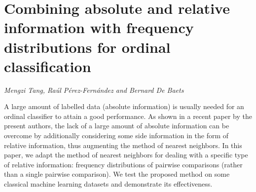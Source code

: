 \documentclass[../booklet.tex]{subfiles}
\begin{document}
\section[Combining absolute and relative information with frequency distributions for ordinal classification. {\it Mengzi Tang, Raúl Pérez-Fernández and Bernard De Baets}]{Combining absolute and relative information with frequency distributions for ordinal classification}
  

\begin{center}
  {\it Mengzi Tang, Raúl Pérez-Fernández and Bernard De Baets}
\end{center}

\vskip 0.8cm


A large amount of labelled data (absolute information) is usually needed for an ordinal classifier to attain a good performance. As shown in a recent paper by the present authors, the lack of a large amount of absolute information can be overcome by additionally considering some side information in the form of relative information, thus augmenting the method of nearest neighbors. In this paper, we adapt the method of nearest neighbors for dealing with a specific type of relative information: frequency distributions of pairwise comparisons (rather than a single pairwise comparison). We test the proposed method on some classical machine learning datasets and demonstrate its effectiveness.

\end{document}
